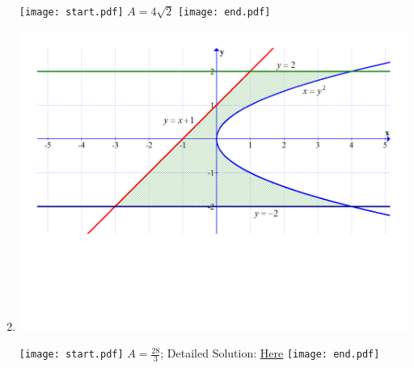 \documentclass[12pt]{article}
\begin{document}
\begin{enumerate}
\begin{center}
\texttt{[image: start.pdf]}
{{$A=4\sqrt{2}$}}
\texttt{[image: end.pdf]}


\end{center}

\item \text{ }

\begin{center}

\includegraphics[scale=0.3]{graph4.pdf}

\texttt{[image: start.pdf]}
{{$A=\frac{28}{3}$; Detailed Solution: \textcolor{blue}{\href{http://www.math.drexel.edu/classes/Calculus/resources/Math122HW/Solutions/122_07_Area_Between_Curves_04.pdf}{Here}}}}
\texttt{[image: end.pdf]}


\end{center}

\end{enumerate}

\end{document}
